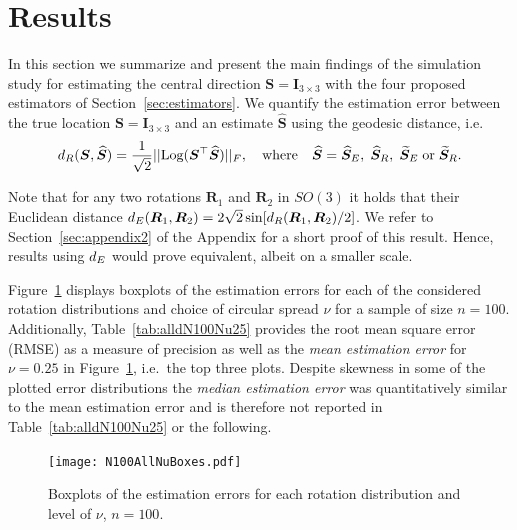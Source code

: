 \section{Results}\label{sec:results}

In this section we summarize and present the main findings of the simulation study for  estimating the central direction $\bm S = \bm I_{3\times 3}$ with the four proposed estimators of Section~\ref{sec:estimators}. We quantify the estimation error between the true location $\bm S = \bm I_{3\times 3}$ and an estimate $\widehat{\bm S}$ using the geodesic distance, i.e.  
\begin{equation}
{d_R}(\bm{S}, \widehat{\bm{S}}) =  \frac{1}{\sqrt{2}}||
\text{Log}(\bm{S}^\top\widehat{\bm{S}})||_F, \quad \mbox{where} \quad \widehat{\bm{S}} =  {\widehat{\bm S}_E}, \; {\widehat{\bm S}_R},\;  {\widetilde{\bm S}_E} \; \mbox{or} \; {\widetilde{\bm S}_R}.
\end{equation}

\noindent Note that for any two rotations $\bm R_1$ and $\bm R_2$ in $SO(3)$ it holds that their Euclidean distance ${d_E}(\bm R_1,\bm R_2)=2\sqrt{2}\sin[{d_R}(\bm R_1,\bm R_2)/2]$. We refer to Section~\ref{sec:appendix2} of the Appendix for a short proof of this result.  Hence, results using ${d_E}$ would prove equivalent, albeit on a smaller scale.   

Figure~\ref{fig:NuBoxes} displays boxplots of the estimation errors for each of the considered rotation distributions and choice of circular spread $\nu$ for a sample of size  $n=100$.  Additionally,  Table~\ref{tab:alldN100Nu25} provides the root mean square error (RMSE) as a measure of precision as well as the \textit{mean estimation error} for $\nu=0.25$ in Figure~\ref{fig:NuBoxes}, i.e.~the top three plots. Despite skewness in some of the plotted error distributions the \textit{median estimation error} was quantitatively similar to the mean estimation error and is therefore not reported in Table~\ref{tab:alldN100Nu25} or the following.
\begin{center}
\begin{figure}[h!]
\texttt{[image: N100AllNuBoxes.pdf]}
\caption{Boxplots of the estimation errors for each rotation distribution and level of $\nu$,  $n=100$.}
\label{fig:NuBoxes}
\end{figure}
\end{center}

